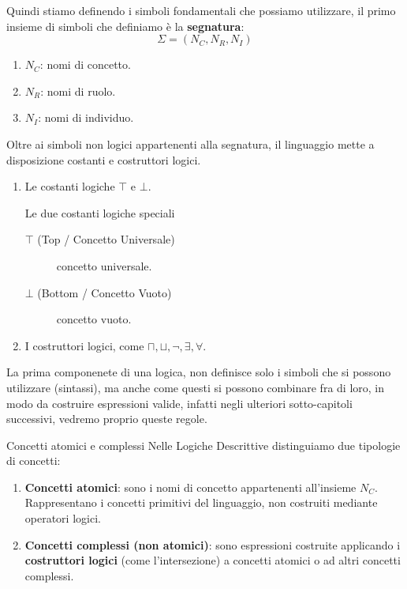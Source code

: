 Quindi stiamo definendo i simboli fondamentali che possiamo utilizzare, il primo insieme di simboli che definiamo è la \textbf{segnatura}:
\[
\Sigma=(N_C,N_R,N_I)
\]
\begin{enumerate}
    \item \(N_C\): nomi di concetto.
    \item \(N_R\): nomi di ruolo.
    \item \(N_I\): nomi di individuo.
\end{enumerate}
Oltre ai simboli non logici appartenenti alla segnatura, il linguaggio mette a disposizione costanti e costruttori logici.
\begin{enumerate}
    \item Le costanti logiche \(\top\) e \(\bot\).
    \begin{definition}{Le due costanti logiche speciali}
    \begin{description}
        \item[\(\top\) (Top / Concetto Universale)]
            concetto universale.
        \item[\(\bot\) (Bottom / Concetto Vuoto)]
            concetto vuoto.
    \end{description}
    \end{definition}
    \item I costruttori logici, come \(\sqcap,\sqcup,\neg,\exists,\forall\).
\end{enumerate}
La prima componenete di una logica, non definisce solo i simboli che si possono utilizzare (sintassi), ma anche come questi si possono combinare fra di loro, in modo da costruire espressioni valide, infatti negli ulteriori sotto-capitoli successivi, vedremo proprio queste regole.
\begin{observation}{Concetti atomici e complessi}
    Nelle Logiche Descrittive distinguiamo due tipologie
    di concetti:
    \begin{enumerate}
        \item \textbf{Concetti atomici}: sono i nomi di
        concetto appartenenti all'insieme $N_C$.
        Rappresentano i concetti primitivi del linguaggio,
        non costruiti mediante operatori logici.

        \item \textbf{Concetti complessi (non atomici)}:
        sono espressioni costruite applicando i
        \textbf{costruttori logici} (come l'intersezione) a concetti atomici
        o ad altri concetti complessi.
    \end{enumerate}
\end{observation}


